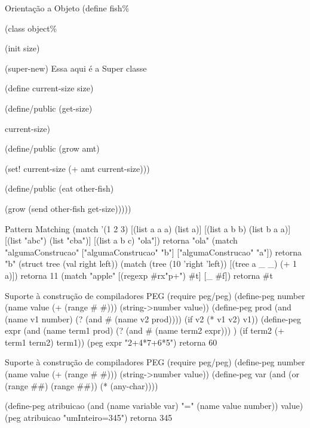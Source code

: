 \documentclass{beamer}
\begin{document}
\begin{frame}{Orientação a Objeto}
(define fish\%

  (class object\%
  
    (init size) 
    
    (super-new) Essa aqui é a Super classe
    
    (define current-size size)
    
    (define/public (get-size)
    
      current-size)
      
    (define/public (grow amt)
    
      (set! current-size (+ amt current-size)))
      
    (define/public (eat other-fish)
    
      (grow (send other-fish get-size)))))


\end{frame}


\begin{frame}{Pattern Matching}
(match '(1 2 3) 
      [(list a a a) (list a)]
      [(list a b b) (list b a a)]
      [(list "abc") (list "cba")]
      [(list a b c) "ola"]) retorna "ola"
 (match "algumaConstrucao" ["algumaConstrucao" "b"] ["algumaConstrucao" "a"]) retorna "b"
 (struct tree (val right left))
 (match (tree (10 'right 'left)) [(tree a _ _) (+ 1 a)]) retorna 11
 (match "apple" [(regexp #rx"p+") #t] [_ #f])  retorna #t
\end{frame}




\begin{frame}{Suporte à construção de compiladores}
PEG
(require peg/peg)
(define-peg number
            (name value (+ (range #\0 #\9)))
            (string->number value))
(define-peg prod
            (and (name v1 number) (? (and #\* (name v2 prod))))
            (if v2 (* v1 v2) v1))
(define-peg expr
            (and (name term1 prod) (? (and #\+ (name term2 expr))) )
            (if term2 (+ term1 term2) term1))
 (peg expr "2+4*7+6*5")     retorna 60
\end{frame}



\begin{frame}{Suporte à construção de compiladores}
PEG
(require peg/peg)
(define-peg number
            (name value (+ (range #\0 #\9)))
            (string->number value))
(define-peg var
            (and (or (range #\a #\z) (range #\A #\Z)) (* (any-char))))

(define-peg atribuicao
            (and (name variable var) "=" (name value number)) value)
(peg atribuicao "umInteiro=345") retorna 345
\end{frame}
\end{document}
